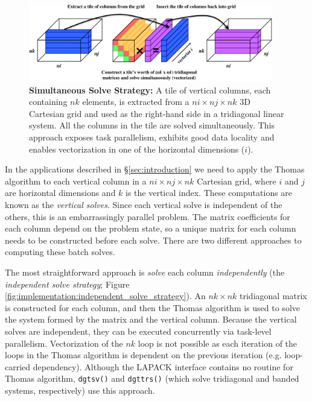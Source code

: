 \documentclass{sig-alternate-05-2015}
\begin{document}
\begin{figure}[!bt]
  \centering
  \label{fig:implementation:simultaneous_solve_strategy}
  \caption{
    \textbf{Simultaneous Solve Strategy:} A tile of vertical columns, each 
      containing \(nk\) elements, is extracted from a \(ni \times nj \times nk\)
      3D Cartesian grid and used as the right-hand side in a tridiagonal linear
      system.
    All the columns in the tile are solved simultaneously.
    This approach exposes task parallelism, exhibits good data locality and
      enables vectorization in one of the horizontal dimensions (\(i\)).
  }
  \includegraphics[width=0.95\textwidth]{figures/simultaneous_solve.pdf}
\end{figure}

In the applications described in \S\ref{sec:introduction} we need to apply the
  Thomas algorithm to each vertical column in a \(ni \times nj \times nk\)
  Cartesian grid, where \(i\) and \(j\) are horizontal dimensions and \(k\) is
  the vertical index.
These computations are known as the \emph{vertical solves}.
Since each vertical solve is independent of the others, this is an
  embarrassingly parallel problem.
The matrix coefficients for each column depend on the problem state, so a
  unique matrix for each column needs to be constructed before each solve.
There are two different approaches to computing these batch solves.

The most straightforward approach is \emph{solve} each column
  \emph{independently} (the \emph{independent solve strategy}; Figure
  \ref{fig:implementation:independent_solve_strategy}).
An \(nk \times nk\) tridiagonal matrix is constructed for each column, and then
  the Thomas algorithm is used to solve the system formed by the matrix and the
  vertical column.
Because the vertical solves are independent, they can be executed concurrently
  via task-level parallelism.
Vectorization of the \(nk\) loop is not possible as each iteration of the loops
  in the Thomas algorithm is dependent on the previous iteration (e.g.
  loop-carried dependency).
Although the LAPACK interface contains no routine for Thomas algorithm,
  \lstinline{dgtsv()} and \lstinline{dgttrs()} (which solve tridiagonal and
  banded systems, respectively) use this approach.
\end{document}
